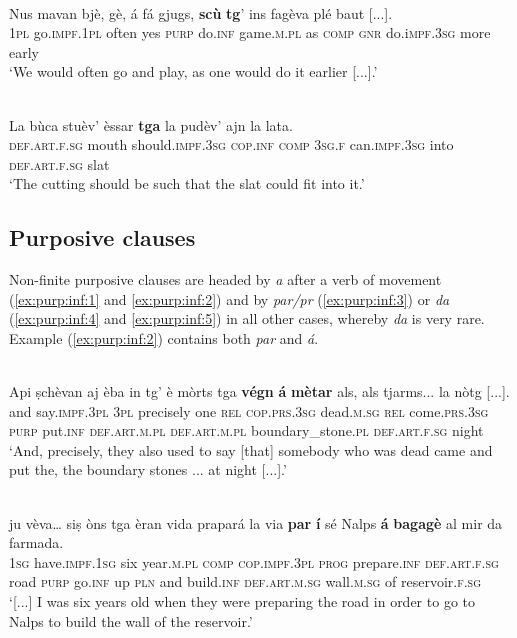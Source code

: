 \ea
\label{ex:manncl3}
\\
\gll Nus mavan bjè, gè, á fá gjugs, \textbf{scù} \textbf{tg}’ ins fagèva plé baut [...].   \\
\textsc{1pl} go.\textsc{impf.1pl} often yes \textsc{purp} do.\textsc{inf} game.\textsc{m.pl} as \textsc{comp} \textsc{gnr} do.i\textsc{mpf.3sg} more early\\
\glt `We would often go and play, as one would do it earlier [...].'
\z

\ea
\label{ex:manncl4}
\\
\gll   La bùca stuèv' èssar \textbf{tga} la pudèv' ajn la lata.\\
\textsc{def.art.f.sg} mouth should.\textsc{impf.3sg} \textsc{cop.inf} \textsc{comp} \textsc{3sg.f} can.\textsc{impf.3sg} into \textsc{def.art.f.sg} slat\\
\glt `The cutting should be such that the slat could fit into it.'
\z

\subsection{Purposive clauses}
Non-finite purposive clauses are headed by \textit{a} after a verb of movement (\ref{ex:purp:inf:1} and \ref{ex:purp:inf:2}) and by \textit{par/pr} (\ref{ex:purp:inf:3}) or \textit{da} (\ref{ex:purp:inf:4} and \ref{ex:purp:inf:5}) in all other cases, whereby \textit{da} is very rare. Example (\ref{ex:purp:inf:2}) contains both \textit{par} and \textit{á}.

\ea\label{ex:purp:inf:1}
\\
\gll  Api ṣchèvan aj èba in tg’ è mòrts tga \textbf{végn} \textbf{á} \textbf{mètar} als, als tjarms... la nòtg [...].\\
and say.\textsc{impf.3pl} \textsc{3pl} precisely one \textsc{rel} \textsc{cop.prs.3sg} dead.\textsc{m.sg} \textsc{rel} come.\textsc{prs.3sg} \textsc{purp} put.\textsc{inf} \textsc{def.art.m.pl} \textsc{def.art.m.pl} boundary\_stone.\textsc{pl} \textsc{def.art.f.sg} night \\
\glt `And, precisely, they also used to say [that] somebody who was dead came and put the, the boundary stones ... at night [...].'
\z

\ea
\label{ex:purp:inf:2}
\\
\gll [...] ju vèva… siṣ òns tga èran vida prapará la via \textbf{par} \textbf{í} sé Nalps \textbf{á} \textbf{bagagè} al mir da farmada.\\
{} \textsc{1sg} have.\textsc{impf.1sg} six year.\textsc{m.pl} \textsc{comp} \textsc{cop.impf.3pl} \textsc{prog} prepare.\textsc{inf} \textsc{def.art.f.sg} road \textsc{purp} go.\textsc{inf} up \textsc{pln} and build.\textsc{inf} \textsc{def.art.m.sg} wall.\textsc{m.sg} of reservoir.\textsc{f.sg} \\ 
\glt `[...] I was six years old when they were preparing the road in order to go to Nalps to build the wall of the reservoir.'
\z

